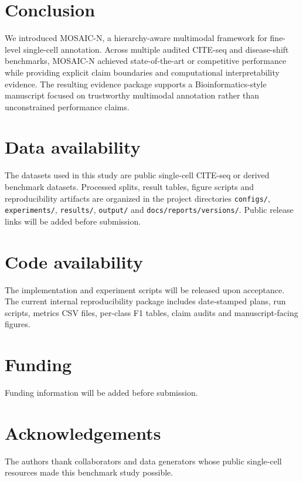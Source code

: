 \documentclass[unnumsec,webpdf,contemporary,large,numbered]{oup-authoring-template}
\begin{document}
\section{Conclusion}

We introduced MOSAIC-N, a hierarchy-aware multimodal framework for fine-level single-cell annotation. Across multiple audited CITE-seq and disease-shift benchmarks, MOSAIC-N achieved state-of-the-art or competitive performance while providing explicit claim boundaries and computational interpretability evidence. The resulting evidence package supports a Bioinformatics-style manuscript focused on trustworthy multimodal annotation rather than unconstrained performance claims.

\section{Data availability}

The datasets used in this study are public single-cell CITE-seq or derived benchmark datasets. Processed splits, result tables, figure scripts and reproducibility artifacts are organized in the project directories \texttt{configs/}, \texttt{experiments/}, \texttt{results/}, \texttt{output/} and \texttt{docs/reports/versions/}. Public release links will be added before submission.

\section{Code availability}

The implementation and experiment scripts will be released upon acceptance. The current internal reproducibility package includes date-stamped plans, run scripts, metrics CSV files, per-class F1 tables, claim audits and manuscript-facing figures.

\section{Funding}

Funding information will be added before submission.

\section{Acknowledgements}

The authors thank collaborators and data generators whose public single-cell resources made this benchmark study possible.
\end{document}
